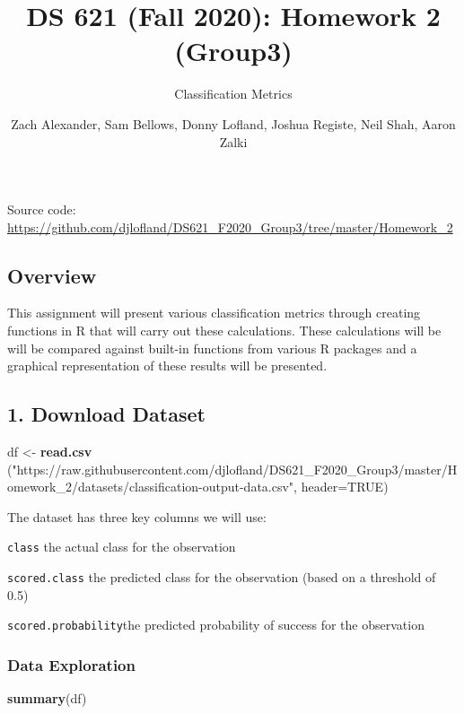 \documentclass[
]{article}
\title{DS 621 (Fall 2020): Homework 2 (Group3)}
\subtitle{Classification Metrics}
\author{Zach Alexander, Sam Bellows, Donny Lofland, Joshua Registe, Neil Shah,
Aaron Zalki}
\date{}
\newenvironment{Shaded}{\begin{snugshade}}{\end{snugshade}}
\newcommand{\DataTypeTok}[1]{\textcolor[rgb]{0.13,0.29,0.53}{#1}}
\newcommand{\KeywordTok}[1]{\textcolor[rgb]{0.13,0.29,0.53}{\textbf{#1}}}
\newcommand{\NormalTok}[1]{#1}
\newcommand{\OtherTok}[1]{\textcolor[rgb]{0.56,0.35,0.01}{#1}}
\newcommand{\StringTok}[1]{\textcolor[rgb]{0.31,0.60,0.02}{#1}}
\begin{document}
\maketitle

Source code:
\url{https://github.com/djlofland/DS621_F2020_Group3/tree/master/Homework_2}

\hypertarget{overview}{%
\subsection{Overview}\label{overview}}

This assignment will present various classification metrics through
creating functions in R that will carry out these calculations. These
calculations will be will be compared against built-in functions from
various R packages and a graphical representation of these results will
be presented.

\hypertarget{download-dataset}{%
\subsection{1. Download Dataset}\label{download-dataset}}

\begin{Shaded}
\begin{Highlighting}[]
\NormalTok{df <-}\StringTok{ }\KeywordTok{read.csv}\NormalTok{ (}\StringTok{"https://raw.githubusercontent.com/djlofland/DS621_F2020_Group3/master/Homework_2/datasets/classification-output-data.csv"}\NormalTok{, }\DataTypeTok{header=}\OtherTok{TRUE}\NormalTok{)}
\end{Highlighting}
\end{Shaded}

The dataset has three key columns we will use:

\texttt{class} the actual class for the observation

\texttt{scored.class} the predicted class for the observation (based on
a threshold of 0.5)

\texttt{scored.probability}the predicted probability of success for the
observation

\hypertarget{data-exploration}{%
\subsubsection{Data Exploration}\label{data-exploration}}

\begin{Shaded}
\begin{Highlighting}[]
\KeywordTok{summary}\NormalTok{(df) }
\end{Highlighting}
\end{Shaded}
\end{document}
